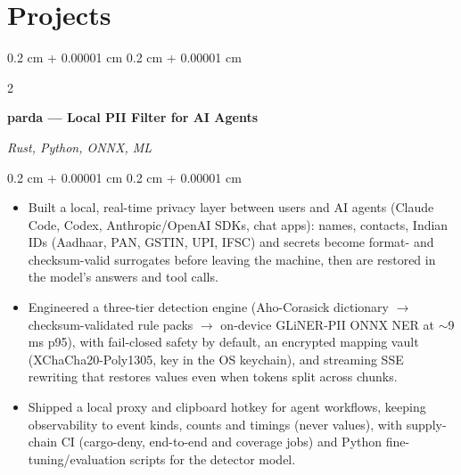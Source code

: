 \documentclass[10pt, letterpaper]{article}
\newenvironment{highlights}{
    \begin{itemize}[
        topsep=0.10 cm,
        parsep=0.10 cm,
        partopsep=0pt,
        itemsep=0pt,
        leftmargin=0.4 cm + 10pt
    ]
}{
    \end{itemize}
} %
\newenvironment{onecolentry}{
    \begin{adjustwidth}{
        0.2 cm + 0.00001 cm
    }{
        0.2 cm + 0.00001 cm
    }
}{
    \end{adjustwidth}
} %
\newenvironment{twocolentry}[2][]{
    \onecolentry
    \def\secondColumn{#2}
    \setcolumnwidth{\fill, 5.0 cm}
    \begin{paracol}{2}
}{
    \switchcolumn \raggedleft \secondColumn
    \end{paracol}
    \endonecolentry
} %
\let\hrefWithoutArrow\href
\renewcommand{\href}[2]{\hrefWithoutArrow{#1}{\ifthenelse{\equal{#2}{}}{ }{#2 }\raisebox{.15ex}{\footnotesize \faExternalLink*}}}
\begin{document}
    \section{Projects}
    \begin{twocolentry}{
        \textit{Rust, Python, ONNX, ML}
    }
        \textbf{parda --- Local PII Filter for AI Agents} \href{https://github.com/deadhearth01/parda}{\faGithub}
    \end{twocolentry}
    \vspace{0.10 cm}
    \begin{onecolentry}
        \begin{highlights}
            \item Built a local, real-time privacy layer between users and AI agents (Claude Code, Codex, Anthropic/OpenAI SDKs, chat apps): names, contacts, Indian IDs (Aadhaar, PAN, GSTIN, UPI, IFSC) and secrets become format- and checksum-valid surrogates before leaving the machine, then are restored in the model's answers and tool calls.
            \item Engineered a three-tier detection engine (Aho-Corasick dictionary $\rightarrow$ checksum-validated rule packs $\rightarrow$ on-device GLiNER-PII ONNX NER at $\sim$9 ms p95), with fail-closed safety by default, an encrypted mapping vault (XChaCha20-Poly1305, key in the OS keychain), and streaming SSE rewriting that restores values even when tokens split across chunks.
            \item Shipped a local proxy and clipboard hotkey for agent workflows, keeping observability to event kinds, counts and timings (never values), with supply-chain CI (cargo-deny, end-to-end and coverage jobs) and Python fine-tuning/evaluation scripts for the detector model.
        \end{highlights}
    \end{onecolentry}
\end{document}
